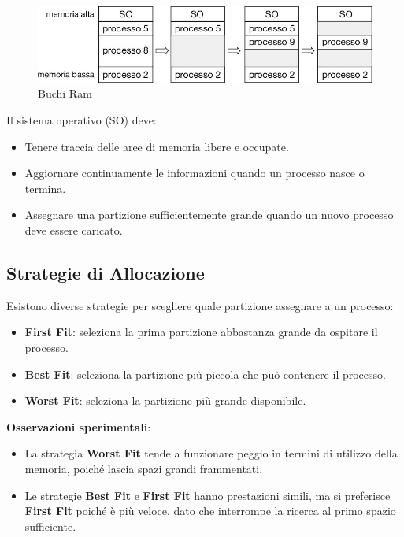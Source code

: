 \begin{figure}[h]
    \centering
    \includegraphics[width=0.5\linewidth]{images/ram_buchi.png}
    \caption{Buchi Ram}
    \label{fig:ram_hole}
\end{figure}
Il sistema operativo (SO) deve:
\begin{itemize}
    \item Tenere traccia delle aree di memoria libere e occupate.
    \item Aggiornare continuamente le informazioni quando un processo nasce o termina.
    \item Assegnare una partizione sufficientemente grande quando un nuovo processo deve essere caricato.
\end{itemize}

\subsection*{Strategie di Allocazione}
Esistono diverse strategie per scegliere quale partizione assegnare a un processo:
\begin{itemize}
    \item \textbf{First Fit}: seleziona la prima partizione abbastanza grande da ospitare il processo.
    \item \textbf{Best Fit}: seleziona la partizione più piccola che può contenere il processo.
    \item \textbf{Worst Fit}: seleziona la partizione più grande disponibile.
\end{itemize}

\textbf{Osservazioni sperimentali}:
\begin{itemize}
    \item La strategia \textbf{Worst Fit} tende a funzionare peggio in termini di utilizzo della memoria, poiché lascia spazi grandi frammentati.
    \item Le strategie \textbf{Best Fit} e \textbf{First Fit} hanno prestazioni simili, ma si preferisce \textbf{First Fit} poiché è più veloce, dato che interrompe la ricerca al primo spazio sufficiente.
\end{itemize}

